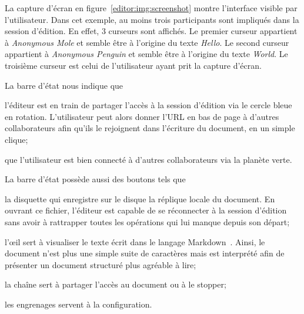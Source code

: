 La capture d'écran en figure~\ref{editor:img:screenshot} montre l'interface
visible par l'utilisateur. Dans cet exemple, au moins trois participants sont
impliqués dans la session d'édition. En effet, 3 curseurs sont affichés. Le
premier curseur appartient à \emph{Anonymous Mole} et semble être à l'origine du
texte \emph{Hello}. Le second curseur appartient à \emph{Anonymous Penguin} et
semble être à l'origine du texte \emph{World}. Le troisième curseur est celui de
l'utilisateur ayant prit la capture d'écran.

La barre d'état nous indique que
\begin{inparaenum}[(i)]
\item l'éditeur est en train de partager l'accès à la session d'édition via le
  cercle bleue en rotation. L'utilisateur peut alors donner l'URL en bas de page
  à d'autres collaborateurs afin qu'ils le rejoignent dans l'écriture du
  document, en un simple clique;
\item que l'utilisateur est bien connecté à d'autres collaborateurs via la
  planète verte.
\end{inparaenum}

La barre d'état possède aussi des boutons tels que
\begin{inparaenum}[(i)]
\item la disquette qui enregistre sur le disque la réplique locale du
  document. En ouvrant ce fichier, l'éditeur est capable de se réconnecter à la
  session d'édition sans avoir à rattrapper toutes les opérations qui lui manque
  depuis son départ;
\item l'œil sert à visualiser le texte écrit dans le langage
  Markdown~\cite{markdown}. Ainsi, le document n'est plus une simple suite de
  caractères mais est interprété afin de présenter un document structuré plus
  agréable à lire;
\item la chaîne sert à partager l'accès au document ou à le stopper;
\item les engrenages servent à la configuration.
\end{inparaenum}


